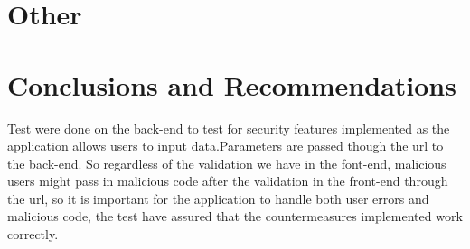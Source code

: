 \documentclass[a4paper,12pt]{article}
\begin{document}
\section{Other}

\section{Conclusions and Recommendations}
Test were done on the back-end to test for security features implemented as the application allows users to input data.Parameters are passed though the url to the back-end. So regardless of the validation we have in the font-end, malicious users might pass in  malicious code after the validation in the front-end through the url, so it is important for the application to handle both user errors and malicious code, the test have assured that the countermeasures implemented work correctly.
\end{document}
